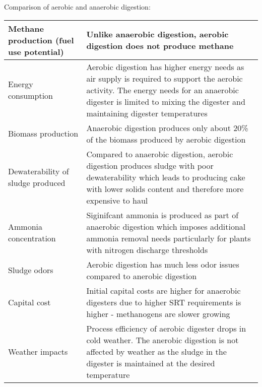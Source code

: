         \begin{center} Comparison of aerobic and anaerobic digestion:
        \setlength{\arrayrulewidth}{0.1mm}
\setlength{\tabcolsep}{8 pt}
\renewcommand{\arraystretch}{1.3}
        \begin{tabular}{| p{5.5cm}| p{10.5cm}|}\hline

        \small Methane production (fuel use potential)& \small Unlike anaerobic digestion, aerobic digestion does not produce methane\\
        \hline

        \small Energy consumption & \small Aerobic digestion has higher energy needs as air supply is required to support the aerobic activity.  The energy needs for an anaerobic digester is limited to mixing the digester and maintaining digester temperatures\\
        \hline

        \small Biomass production & \small Anaerobic digestion produces only about 20\% of the biomass produced by aerobic digestion\\
        \hline

        \small Dewaterability of sludge produced & Compared to anaerobic digestion, aerobic digestion produces sludge with poor dewaterability which leads to producing cake with lower solids content and therefore more expensive to haul\\
        \hline

        \small Ammonia concentration & Siginifcant ammonia is produced as part of anaerobic digestion which imposes additional ammonia removal needs particularly for plants with nitrogen discharge thresholds\\
        \hline

        \small Sludge odors & Aerobic digestion has much less odor issues compared to anerobic digestion \\
        \hline

        \small Capital cost & Initial capital costs are higher for anaerobic digesters due to higher SRT requirements is higher - methanogens are slower growing\\
        \hline

        \small Weather impacts & \small Process efficiency of aerobic digester drops in cold weather.  The anerobic digestion is not affected by weather as the sludge in the digester is maintained at the desired temperature \\
        \hline
            \end{tabular}
             \end{center}

